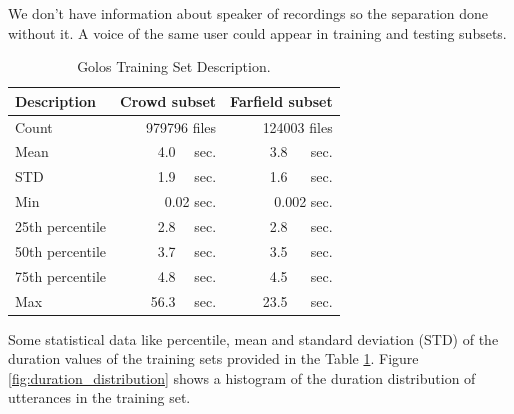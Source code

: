 \documentclass[a4paper]{article}
\begin{document}
We don't have information about speaker of recordings so the separation done without it. A voice of the same user could appear in training and testing subsets. 


\begin{table}[t]
  \caption{Golos Training Set Description.}
  \label{tab:dataset_description}
  \centering
  \begin{tabular}{lrr}
    \toprule
    \textbf{Description}      & \textbf{Crowd  subset}     & \textbf{Farfield subset} \\
    \midrule
    Count & 979796 files & 124003 files \\
    Mean & 4.0~~ sec. & 3.8 ~~ sec. \\
    STD &  1.9~~ sec. & 1.6 ~~ sec. \\
    Min & 0.02 sec. & 0.002 sec. \\
    25th percentile& 2.8~~ sec. & 2.8 ~~ sec. \\
    50th percentile& 3.7~~ sec. & 3.5 ~~ sec. \\
    75th percentile& 4.8~~ sec. & 4.5 ~~ sec. \\
    Max & 56.3~~ sec. & 23.5 ~~ sec. \\
    \bottomrule
  \end{tabular}
\end{table}

Some statistical data like percentile, mean and standard deviation (STD) of the duration values of the training sets provided in the Table \ref{tab:dataset_description}. Figure \ref{fig:duration_distribution} shows a histogram of the duration distribution of utterances in the training set.
\end{document}
